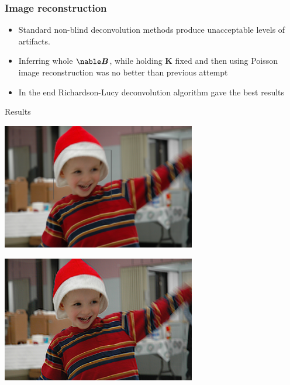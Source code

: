 \documentclass{beamer}
\begin{document}
\begin{frame}
    \frametitle{Image reconstruction}
    \begin{itemize}
        \item Standard non-blind deconvolution methods produce unacceptable levels of artifacts.
        \item Inferring whole $\nable\boldsymbol{B}$, while holding $\boldsymbol{K}$ fixed and then using Poisson image reconstruction was no better than previous attempt
        \item In the end Richardson-Lucy deconvolution algorithm gave the best results
    \end{itemize}
\end{frame}
\begin{frame}[plain]
    \begin{center}
    {\Huge Results}
    \end{center}
\end{frame}
\begin{frame}[plain]
    \begin{center}
        \includegraphics[width=240pt]{img/img-028.png}
    \end{center}
\end{frame}
\begin{frame}[plain]
    \begin{center}
        \includegraphics[width=240pt]{img/img-029.png}
    \end{center}
\end{frame}
\end{document}
